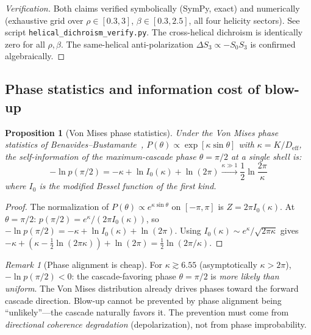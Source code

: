 \documentclass[11pt]{article}
\newtheorem{proposition}[theorem]{Proposition}
\theoremstyle{definition}
\theoremstyle{remark}
\newtheorem{remark}[theorem]{Remark}
\begin{document}
\begin{proof}[Verification]
Both claims verified symbolically (SymPy, exact) and numerically
(exhaustive grid over $\rho \in [0.3, 3]$, $\beta \in [0.3, 2.5]$,
all four helicity sectors). See script
\texttt{helical\_dichroism\_verify.py}. The cross-helical dichroism
is identically zero for all $\rho, \beta$. The same-helical
anti-polarization $\Delta S_3 \propto -S_0 S_3$ is confirmed
algebraically.
\end{proof}

\subsection{Phase statistics and information cost of blow-up}

\begin{proposition}[Von Mises phase statistics]\label{prop:vonmises}
Under the Von Mises phase statistics of
Benavides--Bustamante~\cite{BenavidesBustamante2026},
$P(\theta) \propto \exp[\kappa \sin\theta]$ with
$\kappa = K/D_{\mathrm{eff}}$, the self-information of the
maximum-cascade phase $\theta = \pi/2$ at a single shell is:
\[
  -\ln p(\pi/2) = -\kappa + \ln I_0(\kappa) + \ln(2\pi)
  \xrightarrow{\kappa \gg 1} \frac{1}{2}\ln\frac{2\pi}{\kappa}
\]
where $I_0$ is the modified Bessel function of the first kind.
\end{proposition}

\begin{proof}
The normalization of $P(\theta) \propto e^{\kappa\sin\theta}$ on
$[-\pi,\pi]$ is $Z = 2\pi I_0(\kappa)$. At $\theta = \pi/2$:
$p(\pi/2) = e^\kappa / (2\pi I_0(\kappa))$, so
$-\ln p(\pi/2) = -\kappa + \ln I_0(\kappa) + \ln(2\pi)$.
Using $I_0(\kappa) \sim e^\kappa / \sqrt{2\pi\kappa}$ gives
$-\kappa + (\kappa - \tfrac{1}{2}\ln(2\pi\kappa)) + \ln(2\pi)
= \tfrac{1}{2}\ln(2\pi/\kappa)$.
\end{proof}

\begin{remark}[Phase alignment is cheap]
For $\kappa \gtrsim 6.55$ (asymptotically $\kappa > 2\pi$), $-\ln p(\pi/2) < 0$: the cascade-favoring
phase $\theta = \pi/2$ is \emph{more likely than uniform}. The Von
Mises distribution already drives phases toward the forward cascade
direction. Blow-up cannot be prevented by phase alignment being
``unlikely''---the cascade naturally favors it. The prevention must
come from \emph{directional coherence degradation} (depolarization),
not from phase improbability.
\end{remark}
\end{document}
